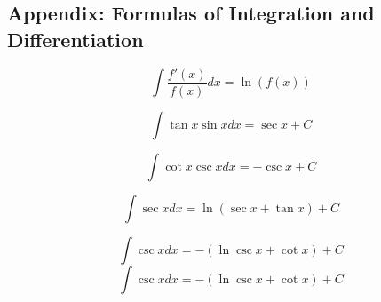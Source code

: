 \documentclass[a4paper,9pt]{scrartcl}
\begin{document}
    \subsection{Appendix: Formulas of Integration and Differentiation}

    \begin{displaymath}
        \int \frac{f'(x)}{f(x)} dx = \ln(f(x))
    \end{displaymath}

    \begin{displaymath}
        \int{\tan{x}\sin{x}}dx = \sec{x} + C
    \end{displaymath}

    \begin{displaymath}
        \int{\cot{x}\csc{x}}dx = -\csc{x} + C
    \end{displaymath}

    \begin{displaymath}
        \int{\sec{x}}dx = \ln{(\sec{x} + \tan{x})} + C
    \end{displaymath}

    \begin{displaymath}
        \int{\csc{x}}dx = -(\ln{\csc{x} + \cot{x}}) + C
    \end{displaymath}
    \begin{displaymath}
        \int{\csc{x}}dx = -(\ln{\csc{x} + \cot{x}}) + C
    \end{displaymath}
\end{document}
